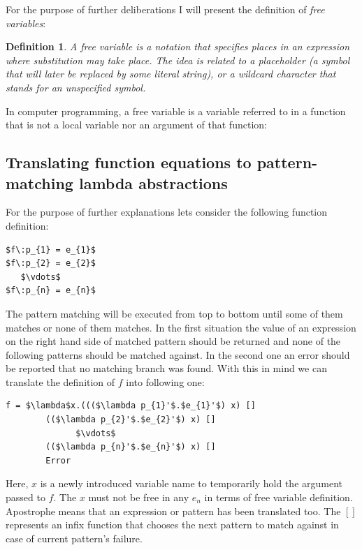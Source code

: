 \documentclass[12pt,a4paper]{report}
\newtheorem{definition}{Definition}[chapter]
\begin{document}
For the purpose of further deliberations I will present the definition of
\textit{free variables}:
\begin{definition}
  \label{def:free_variable}
  A free variable is a notation that specifies places in an expression where
  substitution may take place. The idea is related to a placeholder (a symbol
  that will later be replaced by some literal string), or a wildcard character
  that stands for an unspecified symbol.
\end{definition}

In computer programming, a free variable is a variable referred to in a
function that is not a local variable nor an argument of that function:

\subsection{Translating function equations to pattern-matching lambda
abstractions}
For the purpose of further explanations lets consider the following function
definition:

\vspace*{0.2in}
\begin{lstlisting}[style=haskell,mathescape=true]
$f\:p_{1} = e_{1}$
$f\:p_{2} = e_{2}$
   $\vdots$
$f\:p_{n} = e_{n}$
\end{lstlisting}

The pattern matching will be executed from top to bottom until some of them
matches or none of them matches. In the first situation the value of an
expression on the right hand side of matched pattern should be returned and
none of the following patterns should be matched against. In the second one an
error should be reported that no matching branch was found. With this in mind
we can translate the definition of $f$ into following one:

\vspace*{0.2in}
\begin{lstlisting}[style=haskell,mathescape=true]
f = $\lambda$x.((($\lambda p_{1}'$.$e_{1}'$) x) []
        (($\lambda p_{2}'$.$e_{2}'$) x) []
              $\vdots$
        (($\lambda p_{n}'$.$e_{n}'$) x) []
        Error
\end{lstlisting}
Here, $x$ is a newly introduced variable name to temporarily hold the argument
passed to $f$. The $x$ must not be free in any $e_{n}$ in terms of free
variable definition. Apostrophe means that an expression or pattern has been
translated too. The $[]$ represents an infix function that chooses the next
pattern to match against in case of current pattern's failure.
\end{document}
